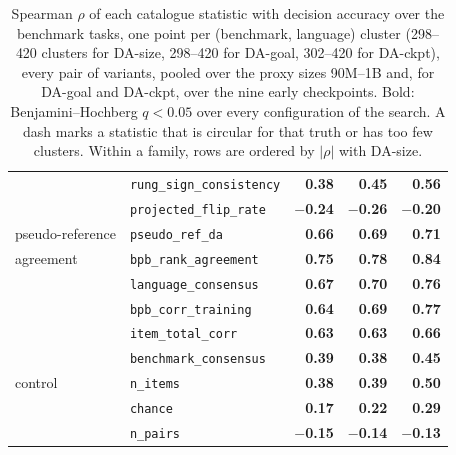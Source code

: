 \begin{table}[h]
\begin{tabular}{@{}llrrr@{}}
 & \texttt{rung\_sign\_consistency} & \textbf{0.38} & \textbf{0.45} & \textbf{0.56} \\
 & \texttt{projected\_flip\_rate} & \textbf{$-$0.24} & \textbf{$-$0.26} & \textbf{$-$0.20} \\
\midrule
pseudo-reference & \texttt{pseudo\_ref\_da} & \textbf{0.66} & \textbf{0.69} & \textbf{0.71} \\
\midrule
agreement & \texttt{bpb\_rank\_agreement} & \textbf{0.75} & \textbf{0.78} & \textbf{0.84} \\
 & \texttt{language\_consensus} & \textbf{0.67} & \textbf{0.70} & \textbf{0.76} \\
 & \texttt{bpb\_corr\_training} & \textbf{0.64} & \textbf{0.69} & \textbf{0.77} \\
 & \texttt{item\_total\_corr} & \textbf{0.63} & \textbf{0.63} & \textbf{0.66} \\
 & \texttt{benchmark\_consensus} & \textbf{0.39} & \textbf{0.38} & \textbf{0.45} \\
\midrule
control & \texttt{n\_items} & \textbf{0.38} & \textbf{0.39} & \textbf{0.50} \\
 & \texttt{chance} & \textbf{0.17} & \textbf{0.22} & \textbf{0.29} \\
 & \texttt{n\_pairs} & \textbf{$-$0.15} & \textbf{$-$0.14} & \textbf{$-$0.13} \\
\bottomrule
\end{tabular}
\caption{Spearman $\rho$ of each catalogue statistic with decision accuracy over the benchmark tasks, one point per (benchmark, language) cluster (298--420 clusters for DA-size, 298--420 for DA-goal, 302--420 for DA-ckpt), every pair of variants, pooled over the proxy sizes 90M--1B and, for DA-goal and DA-ckpt, over the nine early checkpoints. Bold: Benjamini--Hochberg $q < 0.05$ over every configuration of the search. A dash marks a statistic that is circular for that truth or has too few clusters. Within a family, rows are ordered by $|\rho|$ with DA-size. }
\label{tab:sur-corr-catalogue}
\end{table}

